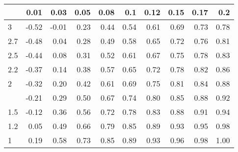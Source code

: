 
\begin{tabular}{lrrrrrrrrr}
\toprule
  & 0.01 & 0.03 & 0.05 & 0.08 & 0.1 & 0.12 & 0.15 & 0.17 & 0.2\\
\midrule
3 & -0.52 & -0.01 & 0.23 & 0.44 & 0.54 & 0.61 & 0.69 & 0.73 & 0.78\\
2.7 & -0.48 & 0.04 & 0.28 & 0.49 & 0.58 & 0.65 & 0.72 & 0.76 & 0.81\\
2.5 & -0.44 & 0.08 & 0.31 & 0.52 & 0.61 & 0.67 & 0.75 & 0.78 & 0.83\\
2.2 & -0.37 & 0.14 & 0.38 & 0.57 & 0.65 & 0.72 & 0.78 & 0.82 & 0.86\\
2 & -0.32 & 0.20 & 0.42 & 0.61 & 0.69 & 0.75 & 0.81 & 0.84 & 0.88\\
\addlinespace
1.7 & -0.21 & 0.29 & 0.50 & 0.67 & 0.74 & 0.80 & 0.85 & 0.88 & 0.92\\
1.5 & -0.12 & 0.36 & 0.56 & 0.72 & 0.78 & 0.83 & 0.88 & 0.91 & 0.94\\
1.2 & 0.05 & 0.49 & 0.66 & 0.79 & 0.85 & 0.89 & 0.93 & 0.95 & 0.98\\
1 & 0.19 & 0.58 & 0.73 & 0.85 & 0.89 & 0.93 & 0.96 & 0.98 & 1.00\\
\bottomrule
\end{tabular}

